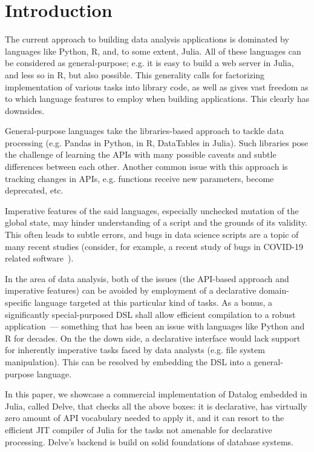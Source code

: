 \section{Introduction}

The current approach to building data analysis applications is
dominated by languages like Python, R, and, to some extent, Julia.
All of these languages can be considered as general-purpose; e.g. it is easy
to build a web server in Julia, and less so in R, but also possible.
This generality calls for factorizing implementation of various tasks into
library code, as well as gives vast freedom as to which language
features to employ when building applications. This clearly has downsides.

General-purpose languages take the libraries-based approach to tackle
data processing (e.g. Pandas in Python, \dplyr in R, DataTables in Julia).
Such libraries pose the challenge of learning the APIs with many possible
caveats and subtle differences between each other.
Another common issue with this approach is tracking changes in APIs, e.g.
functions receive new parameters, become deprecated, etc.

Imperative features of the said languages, especially unchecked mutation
of the global state, may hinder understanding of a script and the grounds
of its validity. This often leads to subtle errors, and bugs in data science
scripts are a topic of many recent studies
(consider, for example, a recent study of bugs in COVID-19 related software~\cite{bugscovid}).

In the area of data analysis,
both of the issues (the API-based approach and imperative features)
can be avoided by employment of a declarative
domain-specific language targeted at this particular kind of tasks.
As a bonus, a significantly special-purposed DSL shall
allow efficient compilation to a robust application~--- something that
has been an issue with languages like Python and R for decades.
On the the down side, a declarative interface would lack support
for inherently imperative tasks faced by data analysts  (e.g. file system manipulation).
This can be resolved by embedding the DSL into a general-purpose
language.

In this paper, we showcase a commercial implementation of Datalog
embedded in Julia, called Delve, that checks all the above boxes: it is declarative,
has virtually zero amount of API vocabulary needed to apply it,
and it can resort to the efficient JIT compiler of Julia for the tasks
not amenable for declarative processing. Delve's backend is build on solid
foundations of database systems.

